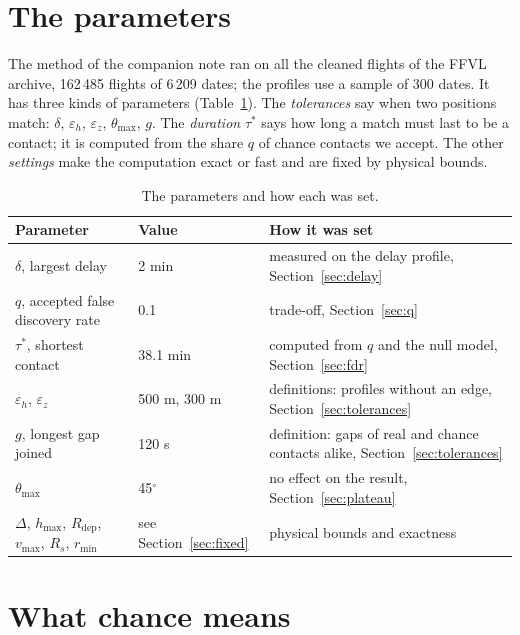 \documentclass[11pt,a4paper]{article}
\begin{document}
\tableofcontents

\section{The parameters}

The method of the companion note ran on all the cleaned flights of the FFVL archive,
162\,485 flights of 6\,209 dates; the profiles use a sample of 300 dates. It has three kinds of
parameters (Table~\ref{tab:parameters}).
The \emph{tolerances} say when two positions match: $\delta$, $\varepsilon_h$,
$\varepsilon_z$, $\theta_{\max}$, $g$. The \emph{duration} $\tau^*$ says how long a match must
last to be a contact; it is computed from the share $q$ of chance contacts we accept. The other
\emph{settings} make the computation exact or fast and are fixed by physical bounds.

\begin{table}[h]
\centering
\small
\begin{tabularx}{\textwidth}{@{}l l X@{}}
\toprule
Parameter & Value & How it was set \\
\midrule
$\delta$, largest delay & 2 min & measured on the delay profile, Section~\ref{sec:delay} \\
$q$, accepted false discovery rate & 0.1 & trade-off, Section~\ref{sec:q} \\
$\tau^*$, shortest contact & 38.1 min & computed from $q$ and the null model, Section~\ref{sec:fdr} \\
$\varepsilon_h$, $\varepsilon_z$ & 500 m, 300 m & definitions: profiles without an edge, Section~\ref{sec:tolerances} \\
$g$, longest gap joined & 120 s & definition: gaps of real and chance contacts alike, Section~\ref{sec:tolerances} \\
$\theta_{\max}$ & 45$^\circ$ & no effect on the result, Section~\ref{sec:plateau} \\
$\Delta$, $h_{\max}$, $R_\mathrm{dep}$, $v_{\max}$, $R_s$, $r_{\min}$ & see Section~\ref{sec:fixed} & physical bounds and exactness \\
\bottomrule
\end{tabularx}
\caption{The parameters and how each was set.}
\label{tab:parameters}
\end{table}

\section{What chance means}\label{sec:chance}
\end{document}
